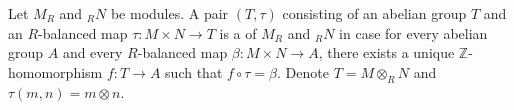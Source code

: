 Let $M_R$ and ${}_R N$ be modules. A pair $(T, \tau)$ consisting of an abelian group $T$ and an $R$-balanced map $\tau: M \times N \to T$ is a  of $M_R$ and ${}_R N$ in case for every abelian group $A$ and every $R$-balanced map $\beta: M \times N \to A$, there exists a unique $\mathbb{Z}$-homomorphism $f: T \to A$ such that $f \circ \tau = \beta$. Denote $T = M \otimes_R N$ and $\tau(m, n) = m \otimes n$.
